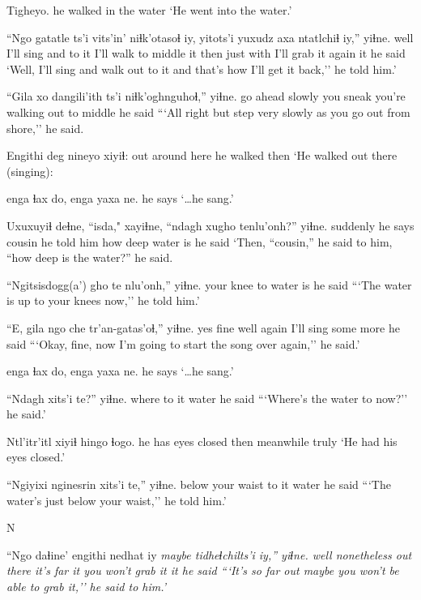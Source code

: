 \documentclass[12pt]{article}
\begin{document}
\gll Tigheyo. 
{{he walked in the water}}
\glt `He went into the water.' 
\glend

\gll ``Ngo gatatle ts'i vits'in' niɬk'otasoɬ iy, yitots'i yuxudz axa ntatlchiɬ iy,'' yiɬne. 
well {I'll sing} and {to it} {I'll walk to middle} it then just with {I'll grab it again} it {he said} 
\glt `Well, I'll sing and walk out to it and that's how I'll get it back,'' he told him.' 
\glend

\gll ``Gila xo dangili'ith ts'i niɬk'oghnguhoɬ,'' yiɬne. 
{go ahead} {slowly} {you sneak} {} {you're walking out to middle} {he said}
\glt ```All right but step very slowly as you go out from shore,'' he said. 
\glend

\gll Engithi deg nineyo xiyiɬ: 
out {around here} {he walked} then
\glt `He walked out there (singing):
\glend

 {enga ɬax do,} {enga yaxa} ne.
{} {} {} {he says}
\glt `\ldots he sang.' 
\glend

\gll Uxuxuyiɬ deɬne, ``isda," xayiɬne, {``ndagh xugho} tenlu'onh?'' yiɬne. 
suddenly {he says} cousin {he told him} {how deep} {water is} {he said}
\glt `Then, ``cousin,'' he said to him, ``how deep is the water?'' he said. 
\glend

\gll ``Ngitsisdogg(a') gho te nlu'onh,'' yiɬne.
{your knee} to {water is} {he said}
\glt ```The water is up to your knees now,'' he told him.' 
\glend

\gll ``E, gila ngo che tr'an-gatas'oɬ,'' yiɬne. 
yes fine well again {I'll sing some more} {he said}
\glt ```Okay, fine, now I'm going to start the song over again,'' he said.' 
\glend

 {enga ɬax do,} {enga yaxa }  ne.
{} {} {} {he says}
\glt `\ldots he sang.' 
\glend

\gll ``Ndagh xits'i te?'' yiɬne. 
where {to it} water {he said}
\glt ```Where's the water to now?'' he said.' 
\glend

\gll Ntl'itr'itl xiyiɬ hingo ɬogo. 
{he has eyes closed} then meanwhile truly
\glt `He had his eyes closed.'
\glend

\gll ``Ngiyixi nginesrin xits'i te,'' yiɬne. 
below {your waist} {to it} water {he said}
\glt ```The water's just below your waist,'' he told him.' 
\glend

N

\gll ``Ngo daɬine' engithi nedhat iy \em{maybe} tidheɬchilts'i iy,'' yiɬne. 
well nonetheless {out there} {it's far} it {} {you won't grab it} it {he said}
\glt ```It's so far out maybe you won't be able to grab it,'' he said to him.' 
\glend
\end{document}
